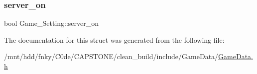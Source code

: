 \subsubsection{\texorpdfstring{server\+\_\+on}{server\_on}}
{\footnotesize\ttfamily bool Game\+\_\+\+Setting\+::server\+\_\+on}



The documentation for this struct was generated from the following file\+:\begin{DoxyCompactItemize}
\item 
/mnt/hdd/fnky/\+C0de/\+C\+A\+P\+S\+T\+O\+N\+E/clean\+\_\+build/include/\+Game\+Data/\hyperlink{GameData_8h}{Game\+Data.\+h}\end{DoxyCompactItemize}

